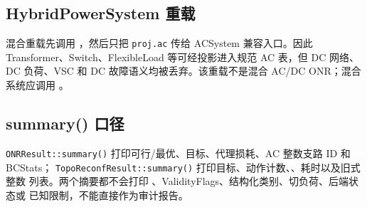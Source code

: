 \subsection{HybridPowerSystem 重载}

混合重载先调用 ，然后只把 \texttt{proj.ac} 传给
ACSystem 兼容入口。因此 Transformer、Switch、FlexibleLoad 等可经投影进入规范 AC 表，但 DC 网络、
DC 负荷、VSC 和 DC 故障语义均被丢弃。该重载不是混合 AC/DC ONR；混合系统应调用
。

\subsection{summary() 口径}

\texttt{ONRResult::summary()} 打印可行/最优、目标、代理损耗、AC 整数支路 ID 和 BCStats；
\texttt{TopoReconfResult::summary()} 打印目标、动作计数、、耗时以及旧式整数
列表。两个摘要都不会打印 、ValidityFlags、结构化类别、切负荷、后端状态或
已知限制，不能直接作为审计报告。
